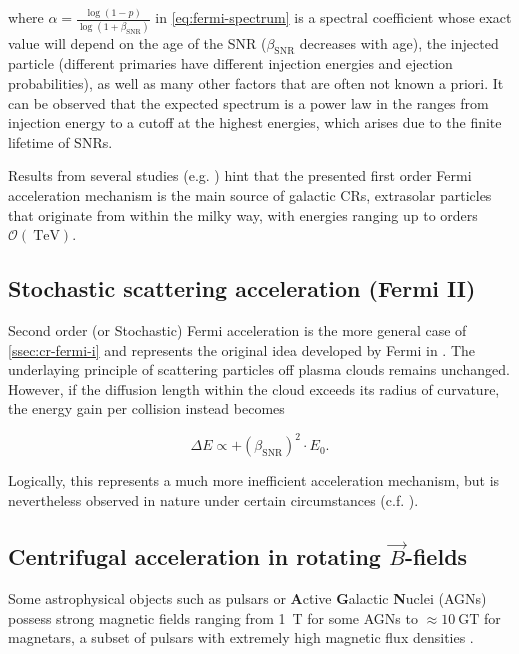 where $\alpha = \frac{\log(1 - p)}{\log(1 + \beta_\text{SNR})}$ in \autoref{eq:fermi-spectrum} is a spectral coefficient whose exact value will depend on the age 
of the SNR ($\beta_\text{SNR}$ decreases with age), the injected particle (different primaries have different injection energies and ejection probabilities), as 
well as many other factors that are often not known a priori. It can be observed that the expected spectrum is a power law in the ranges from injection energy to a
cutoff at the highest energies, which arises due to the finite lifetime of SNRs.

Results from several studies (e.g. \cite{aab2015searches, hillas2005can, blasi2013origin}) hint that the presented first order Fermi acceleration mechanism is the 
main source of galactic CRs, extrasolar particles that originate from within the milky way, with energies ranging up to orders 
$\mathcal{O}(\SI{}{\tera\electronvolt})$.

\subsection{Stochastic scattering acceleration (Fermi II)}
\label{ssec:cr-fermi-ii}

Second order (or Stochastic) Fermi acceleration is the more general case of \autoref{ssec:cr-fermi-i} and represents the original idea developed by Fermi in 
\cite{fermi1949origin}. The underlaying principle of scattering particles off plasma clouds remains unchanged. However, if the diffusion length within the cloud 
exceeds its radius of curvature, the energy gain per collision instead becomes

\begin{equation}
\Delta E \propto + \left( \beta_\text{SNR}\right)^2 \cdot E_0.
\end{equation}

Logically, this represents a much more inefficient acceleration mechanism, but is nevertheless observed in nature under certain circumstances (c.f. 
\cite{asano2015most}).

\subsection{Centrifugal acceleration in rotating $\vec{B}$-fields}
\label{ssec:cr-centrifugal-acceleration}

Some astrophysical objects such as pulsars or \textbf{A}ctive \textbf{G}alactic \textbf{N}uclei (AGNs) possess strong magnetic fields ranging from \SI{1}{\tesla}
for some AGNs \cite{daly2019black} to $\approx\SI{10}{\giga\tesla}$ for magnetars, a subset of pulsars with extremely high magnetic flux densities 
\cite{flowers1977evolution}.

